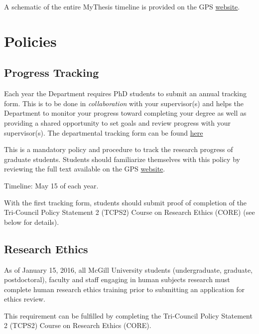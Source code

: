 \documentclass[
  openany]{book}
\begin{document}
A schematic of the entire MyThesis timeline is provided on the GPS \href{https://www.mcgill.ca/gps/files/gps/mcgill_mythesis_overview_of_process.pdf}{website}.

\hypertarget{policies}{%
\chapter{Policies}\label{policies}}

\hypertarget{progress-tracking}{%
\section{Progress Tracking}\label{progress-tracking}}

Each year the Department requires PhD students to submit an annual tracking form. This is to be done in \emph{collaboration} with your supervisor(s) and helps the Department to monitor your progress toward completing your degree as well as providing a shared opportunity to set goals and review progress with your supervisor(s). The departmental tracking form can be found \href{https://www.mcgill.ca/epi-biostat-occh/files/epi-biostat-occh/gps_gradstudent_progress_tracking_report_2020.pdf}{here}

This is a mandatory policy and procedure to track the research progress of graduate students. Students should familiarize themselves with this policy by reviewing the full text available on the GPS \href{https://www.mcgill.ca/gps/students/progress-tracking}{website}.

Timeline: May 15 of each year.

With the first tracking form, students should submit proof of completion of the Tri-Council Policy Statement 2 (TCPS2) Course on Research Ethics (CORE) (see below for details).

\hypertarget{research-ethics}{%
\section{Research Ethics}\label{research-ethics}}

As of January 15, 2016, all McGill University students (undergraduate, graduate, postdoctoral), faculty and staff engaging in human subjects research must complete human research ethics training prior to submitting an application for ethics review.

This requirement can be fulfilled by completing the Tri-Council Policy Statement 2 (TCPS2) Course on Research Ethics (CORE).
\end{document}
